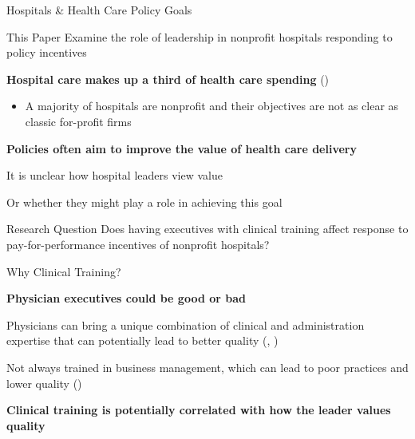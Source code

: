 \documentclass[notes,11pt, aspectratio=169]{beamer}
\newenvironment{wideitemize}{\itemize\addtolength{\itemsep}{10pt}}{\enditemize}
\begin{document}
\begin{frame}{Hospitals \& Health Care Policy Goals}

\begin{block}{This Paper}
    Examine the role of leadership in nonprofit hospitals responding to policy incentives 
\end{block}

\vspace{5mm}

\textbf{Hospital care makes up a third of health care spending} \scriptsize (\cite{cms2024nhe}) \normalsize
\begin{itemize}
    \item A majority of hospitals are nonprofit and their objectives are not as clear as classic for-profit firms
\end{itemize}

\vspace{5mm}

\textbf{Policies often aim to improve the value of health care delivery}

\vspace{3mm}

    \begin{wideitemize}
        \item It is unclear how hospital leaders view value
        \item Or whether they might play a role in achieving this goal
    \end{wideitemize}
\end{frame}

\begin{frame}{Research Question}
    \centering
    \large
    Does having executives with clinical training affect response to pay-for-performance incentives of nonprofit hospitals?
\end{frame}

\begin{frame}{Why Clinical Training?}

\textbf{Physician executives could be good or bad}

\vspace{2mm}

\begin{wideitemize}
    \item Physicians can bring a unique combination of clinical and administration expertise that can potentially lead to better quality \scriptsize (\cite{Stajduhar_2023}, \cite{Ahmed_2022}) \normalsize

    \vspace{2mm}
    
    \item Not always trained in business management, which can lead to poor practices and lower quality \scriptsize (\cite{HarvardBusinessReview2018})
\end{wideitemize}

\vspace{10mm}

\textbf{Clinical training is potentially correlated with how the leader values quality}
\end{frame}
\end{document}
